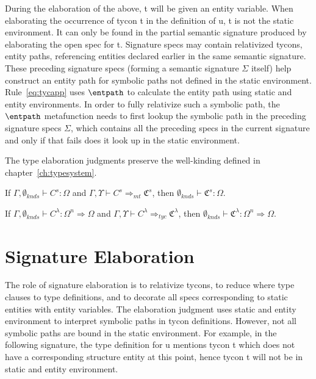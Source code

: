 \documentclass[9pt,nocopyrightspace, fleqn]{sigplanconf}
\begin{document}
During the elaboration of the above, t will be given an entity variable. When elaborating the occurrence of tycon t in the definition of u, t is not the static environment. It can only be found in the partial semantic signature produced by elaborating the open spec for t. Signature specs may contain relativized tycons, entity paths,
referencing entities declared earlier in the same semantic signature. These preceding signature specs (forming a semantic signature $\Sigma$ itself)
help construct an entity path for symbolic paths not defined in the
static environment. Rule~\ref{eq:tycapp} uses $\entpath$ to calculate the entity path using static and entity environments. In order
to fully relativize such a symbolic path, the $\entpath$ metafunction
needs to first lookup the symbolic path in the preceding signature
specs $\Sigma$, which contains all the preceding specs in the current signature and only if that fails does it look up in the static environment.  


The type elaboration judgments preserve the well-kinding defined in chapter~\ref{ch:typesystem}.

\begin{lemma}
If $\Gamma,\emptyset_{knds}\vdash C^s : \Omega$ and $\Gamma,\Upsilon\vdash C^s \Rightarrow_{mt} \mathfrak{C}^s$, then $\emptyset_{knds}\vdash \mathfrak{C}^s : \Omega$. 
\end{lemma}

\begin{lemma}
If $\Gamma,\emptyset_{knds}\vdash C^\lambda : \Omega^n \Rightarrow
\Omega$ and $\Gamma,\Upsilon\vdash C^\lambda \Rightarrow_{tyc}
\mathfrak{C}^\lambda$, then $\emptyset_{knds}\vdash \mathfrak{C}^\lambda : \Omega^n \Rightarrow \Omega$.
\end{lemma}

\section{Signature Elaboration}
The role of signature elaboration is to relativize tycons, to reduce where type clauses to type definitions, and to decorate all specs corresponding to static entities with  entity variables. The elaboration judgment uses static and entity environment to interpret symbolic paths in tycon definitions. However, not all symbolic paths are bound in the static environment. For example, in the following signature, the type definition for u mentions tycon t which does not have a corresponding structure entity at this point, hence tycon t will not be in static and entity environment. 
\end{document}
